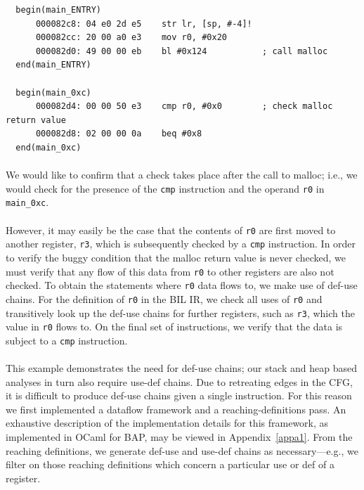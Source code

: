 \documentclass[letterpaper,11pt]{article}
\begin{document}
\begin{center}
\lstset{language=C, label=mallocdisasm,
caption=Malloc disassembly, breaklines=true, basicstyle=\tiny, numbers=none}
\begin{lstlisting}
  begin(main_ENTRY)
      000082c8: 04 e0 2d e5    str lr, [sp, #-4]!
      000082cc: 20 00 a0 e3    mov r0, #0x20
      000082d0: 49 00 00 eb    bl #0x124           ; call malloc
  end(main_ENTRY)

  begin(main_0xc)
      000082d4: 00 00 50 e3    cmp r0, #0x0        ; check malloc return value
      000082d8: 02 00 00 0a    beq #0x8
  end(main_0xc)
\end{lstlisting}
\label{fig:malloc}
\end{center}

\paragraph{}
We would like to confirm that a check takes place after the call to malloc;
i.e., we would check for the presence of the \texttt{cmp} instruction and the
operand \texttt{r0} in \texttt{main\_0xc}.

\paragraph{}
However, it may easily be the case that the contents of \texttt{r0} are first
moved to another register, \texttt{r3}, which is subsequently checked by a
\texttt{cmp} instruction. In order to verify the buggy condition that the malloc
return value is never checked, we must verify that any flow of this data from
\texttt{r0} to other registers are also not checked. To obtain the statements
where \texttt{r0} data flows to, we make use of def-use chains. For the
definition of \texttt{r0} in the BIL IR, we check all uses of \texttt{r0} and
transitively look up the def-use chains for further registers, such as
\texttt{r3}, which the value in \texttt{r0} flows to. On the final set of
instructions, we verify that the data is subject to a \texttt{cmp} instruction.

\paragraph{}
This example demonstrates the need for def-use chains; our stack and heap based
analyses in turn also require use-def chains. Due to retreating edges in the
CFG, it is difficult to produce def-use chains given a single instruction. For
this reason we first implemented a dataflow framework and a
reaching-definitions pass. An exhaustive description of the
implementation details for this framework, as implemented in OCaml for
BAP, may be viewed in Appendix~\ref{appa1}.
From the reaching definitions, we generate def-use
and use-def chains as necessary---e.g., we filter on those reaching definitions
which concern a particular use or def of a register.
\end{document}
